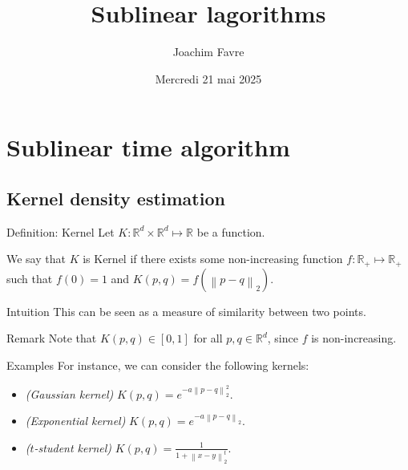 \documentclass[a4paper]{article}
\title{Sublinear lagorithms}
\author{Joachim Favre}
\date{Mercredi 21 mai 2025}
\begin{document}
\maketitle


\section{Sublinear time algorithm}
\subsection{Kernel density estimation}

\begin{parag}{Definition: Kernel}
    Let $K: \mathbb{R}^d \times \mathbb{R}^d \mapsto \mathbb{R}$ be a function.

    We say that $K$ is Kernel if there exists some non-increasing function $f: \mathbb{R}_+ \mapsto \mathbb{R}_+$ such that $f\left(0\right) = 1$ and $K\left(p, q\right) = f\left(\left\|p - q\right\|_2\right)$. 

    \begin{subparag}{Intuition}
        This can be seen as a measure of similarity between two points.
    \end{subparag}

    \begin{subparag}{Remark}
        Note that $K\left(p, q\right) \in \left[0, 1\right]$ for all $p, q \in \mathbb{R}^d$, since $f$ is non-increasing.
    \end{subparag}

    \begin{subparag}{Examples}
        For instance, we can consider the following kernels:
        \begin{itemize}
            \item \textit{(Gaussian kernel)} $\displaystyle K\left(p, q\right) = e^{-a \left\|p - q\right\|_2^2}$.
            \item \textit{(Exponential kernel)} $\displaystyle K\left(p, q\right) = e^{-a \left\|p - q\right\|_2}$.
            \item \textit{($t$-student kernel)} $\displaystyle K\left(p, q\right) = \frac{1}{1 + \left\|x- y\right\|_2^t}$.
        \end{itemize}
    \end{subparag}
\end{parag}
\end{document}

